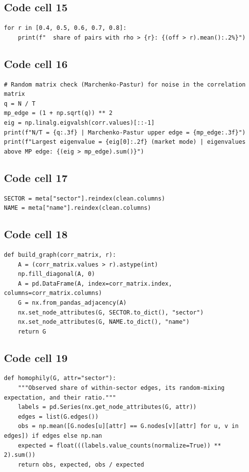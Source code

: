 \documentclass[12pt,a4paper]{report}
\begin{document}
\subsection*{Code cell 15}
\begin{lstlisting}[style=fancy]
for r in [0.4, 0.5, 0.6, 0.7, 0.8]:
    print(f"  share of pairs with rho > {r}: {(off > r).mean():.2%}")
\end{lstlisting}

\subsection*{Code cell 16}
\begin{lstlisting}[style=fancy]
# Random matrix check (Marchenko-Pastur) for noise in the correlation matrix
q = N / T
mp_edge = (1 + np.sqrt(q)) ** 2
eig = np.linalg.eigvalsh(corr.values)[::-1]
print(f"N/T = {q:.3f} | Marchenko-Pastur upper edge = {mp_edge:.3f}")
print(f"Largest eigenvalue = {eig[0]:.2f} (market mode) | eigenvalues above MP edge: {(eig > mp_edge).sum()}")
\end{lstlisting}

\subsection*{Code cell 17}
\begin{lstlisting}[style=fancy]
SECTOR = meta["sector"].reindex(clean.columns)
NAME = meta["name"].reindex(clean.columns)
\end{lstlisting}

\subsection*{Code cell 18}
\begin{lstlisting}[style=fancy]
def build_graph(corr_matrix, r):
    A = (corr_matrix.values > r).astype(int)
    np.fill_diagonal(A, 0)
    A = pd.DataFrame(A, index=corr_matrix.index, columns=corr_matrix.columns)
    G = nx.from_pandas_adjacency(A)
    nx.set_node_attributes(G, SECTOR.to_dict(), "sector")
    nx.set_node_attributes(G, NAME.to_dict(), "name")
    return G
\end{lstlisting}

\subsection*{Code cell 19}
\begin{lstlisting}[style=fancy]
def homophily(G, attr="sector"):
    """Observed share of within-sector edges, its random-mixing expectation, and their ratio."""
    labels = pd.Series(nx.get_node_attributes(G, attr))
    edges = list(G.edges())
    obs = np.mean([G.nodes[u][attr] == G.nodes[v][attr] for u, v in edges]) if edges else np.nan
    expected = float(((labels.value_counts(normalize=True)) ** 2).sum())
    return obs, expected, obs / expected
\end{lstlisting}
\end{document}
